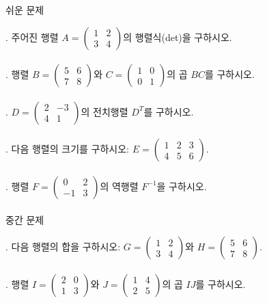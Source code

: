\documentclass[fleqn]{article}
\begin{document}
      
         쉬운 문제

. 주어진 행렬 \( A = \begin{pmatrix} 1 & 2 \\ 3 & 4 \end{pmatrix} \)의 행렬식(det)을 구하시오. \\\\
  
. 행렬 \( B = \begin{pmatrix} 5 & 6 \\ 7 & 8 \end{pmatrix} \)와 \( C = \begin{pmatrix} 1 & 0 \\ 0 & 1 \end{pmatrix} \)의 곱 \( BC \)를 구하시오. \\\\
  
. \( D = \begin{pmatrix} 2 & -3 \\ 4 & 1 \end{pmatrix} \)의 전치행렬 \( D^T \)를 구하시오. \\\\
  
. 다음 행렬의 크기를 구하시오: \( E = \begin{pmatrix} 1 & 2 & 3 \\ 4 & 5 & 6 \end{pmatrix} \). \\\\
  
. 행렬 \( F = \begin{pmatrix} 0 & 2 \\ -1 & 3 \end{pmatrix} \)의 역행렬 \( F^{-1} \)을 구하시오. \\\\

 중간 문제

. 다음 행렬의 합을 구하시오: \( G = \begin{pmatrix} 1 & 2 \\ 3 & 4 \end{pmatrix} \)와 \( H = \begin{pmatrix} 5 & 6 \\ 7 & 8 \end{pmatrix} \). \\\\
  
. 행렬 \( I = \begin{pmatrix} 2 & 0 \\ 1 & 3 \end{pmatrix} \)와 \( J = \begin{pmatrix} 1 & 4 \\ 2 & 5 \end{pmatrix} \)의 곱 \( IJ \)를 구하시오. \\\\
  
\end{document}
